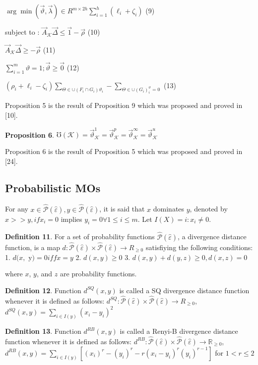 \documentclass[10pt,a4paper]{IOS-Book-Article}
\begin{document}
$\arg \min(\vec{\vartheta},\vec{\lambda})\in R^{m \times 2h}\sum^h_{i=1}(\ell_i + \zeta_i)$ (9)

subject to : $\vec{A}_\mathcal{K} \vec{\Delta} \le \vec{1} − \vec{\rho}$ (10)

$\vec{A}_\mathcal{K} \vec\Delta\geq −\vec{\rho}$ (11)

$\sum^m_{i=1} \vartheta = 1;\vec{\vartheta}\geq\vec{0}$ (12)

$(\rho_i + \ell_i − \zeta_i)\sum_{\Theta \in \cup(F_i \cap G_i)\vartheta_i} − \sum_{\Theta\in\cup(G_i)^\vartheta_i=0}$ (13)

Proposition 5 is the result of Proposition 9 which  was proposed and proved in [10].

\textbf{Proposition 6}. $\mho(\mathcal{K}) = \vec{\vartheta}^1_\mathcal{K} = \vec{\vartheta}^p_\mathcal{K} = \vec{\vartheta}^\infty_\mathcal{K} = \vec{\vartheta}^u_\mathcal{K}$

Proposition 6 is the result of Proposition 5 which was proposed and proved in [24].

\subsection{Probabilistic MOs}

For any $x \in \hat{\mathcal{P}}(\hat{\varepsilon}), y \in \hat{\mathcal{P}}(\hat{\varepsilon})$, it is said that $x$ dominates $y$, denoted by $x >> y, if x_i = 0$ implies $y_i = 0 \forall 1 \le i \le m$. Let $I(X) = {i : x_i \neq 0}$. 

\textbf{Definition 11}. For a set of probability functions $\hat{\mathcal{P}} (\hat{\varepsilon})$, a divergence distance function, is a map $d : \hat{\mathcal{P}} (\hat{\varepsilon}) \times \hat{\mathcal{P}} (\hat{\varepsilon}) \to R_{\geq0}$ satisfiying the following conditions: 
1. $d(x,$ y$) = 0 iff x = y$ 
2. $d(x, y) \geq 0$
3. $d(x, y) + d(y, z)\ge0, d(x, z) = 0$

where $x$, $y$, and $z$ are probability functions. 

\textbf{Definition 12}. Function $d^{SQ}(x, y)$ is called a SQ divergence distance function whenever it is defined as follows: $d^{SQ} : \hat{\mathcal{P}} (\hat{\varepsilon}) \times \hat{\mathcal{P}} (\hat{\varepsilon}) \to R_{\geq0}$, $d^{SQ}(x, y) = \sum_{i \in I(y)} (x_i − y_i)^2$

\textbf{Definition 13}. Function $d^{RB}(x, y)$ is called a Renyi-B divergence distance function whenever it is defined as follows: $d^{RB} : \hat{\mathcal{P}}(\hat{\varepsilon}) \times \hat{\mathcal{P}} (\hat{\varepsilon}) \to \mathbb{R}_{\ge 0}$, $d^{RB}(x, y)=\sum_{i\in I(y)}[(x_i)^r − (y_i)^r − r(x_i − y_i)^r(y_i)^{r−1}]$ for $1 < r \le 2$
 
\end{document}
